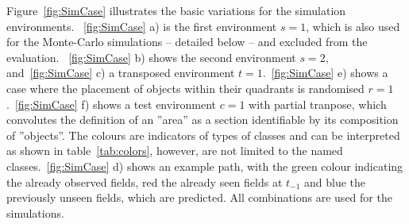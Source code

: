 \documentclass[twocolumn,letterpaper]{IEEEAerospaceCLS}  %
\begin{document}
Figure~\ref{fig:SimCase} illustrates the basic variations for the simulation environments. ~\ref{fig:SimCase} a) is the first environment $s=1$, which is also used for the Monte-Carlo simulations -- detailed below --  and excluded from the evaluation. ~\ref{fig:SimCase} b) shows the second environment $s=2$, and~\ref{fig:SimCase} c) a transposed environment $t=1$.~\ref{fig:SimCase} e) shows a case where the placement of objects within their quadrants is randomised $r=1$.~\ref{fig:SimCase} f) shows a test environment $c=1$ with partial tranpose, which convolutes the definition of an ''area'' as a section identifiable by its composition of ''objects''. The colours are indicators of types of classes and can be interpreted as shown in table~\ref{tab:colors}, however, are not limited to the named classes.~\ref{fig:SimCase} d) shows an example path, with the green colour indicating the already observed fields, red the already seen fields at $t_{-1}$ and blue the previously unseen fields, which are predicted. All combinations are used for the simulations.
\end{document}
